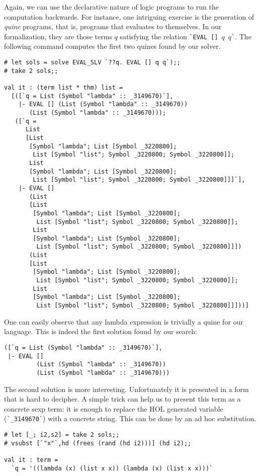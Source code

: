 Again, we can use the declarative nature of logic programs to run the
computation backwards.  For instance, one intriguing exercise is the
generation of \textit{quine} programs, that is, programs that evaluates to
themselves.  In our formalization, they are those terms $q$ satisfying
the relation \verb|`EVAL|~\verb|[]|~$q$~$q$\verb|`|.  The following command
computes the first two quines found by our solver.
\begin{verbatim}
# let sols = solve EVAL_SLV `??q. EVAL [] q q`);;
# take 2 sols;;

val it : (term list * thm) list =
  [([`q = List (Symbol "lambda" :: _3149670)`],
    |- EVAL [] (List (Symbol "lambda" :: _3149670))
       (List (Symbol "lambda" :: _3149670)));
   ([`q =
      List
      [List
       [Symbol "lambda"; List [Symbol _3220800];
        List [Symbol "list"; Symbol _3220800; Symbol _3220800]];
       List
       [Symbol "lambda"; List [Symbol _3220800];
        List [Symbol "list"; Symbol _3220800; Symbol _3220800]]]`],
    |- EVAL []
       (List
       [List
        [Symbol "lambda"; List [Symbol _3220800];
         List [Symbol "list"; Symbol _3220800; Symbol _3220800]];
        List
        [Symbol "lambda"; List [Symbol _3220800];
         List [Symbol "list"; Symbol _3220800; Symbol _3220800]]])
       (List
       [List
        [Symbol "lambda"; List [Symbol _3220800];
         List [Symbol "list"; Symbol _3220800; Symbol _3220800]];
        List
        [Symbol "lambda"; List [Symbol _3220800];
         List [Symbol "list"; Symbol _3220800; Symbol _3220800]]]))]
\end{verbatim}

One can easily observe that any lambda expression is trivially a quine
for our language.  This is indeed the first solution found by our
search:
\begin{verbatim}
([`q = List (Symbol "lambda" :: _3149670)`],
 |- EVAL []
         (List (Symbol "lambda" :: _3149670))
         (List (Symbol "lambda" :: _3149670)))
\end{verbatim}

The second solution is more interesting.  Unfortunately it is
presented in a form that is hard to decipher.  A simple trick can help
us to present this term as a concrete sexp term: it is enough to
replace the HOL generated variable (\verb|`_3149670`|) with a concrete
string.  This can be done by an ad hoc substitution.
\begin{verbatim}
# let [_; i2,s2] = take 2 sols;;
# vsubst [`"x"`,hd (frees (rand (hd i2)))] (hd i2);;

val it : term =
  `q = '((lambda (x) (list x x)) (lambda (x) (list x x)))`
\end{verbatim}

